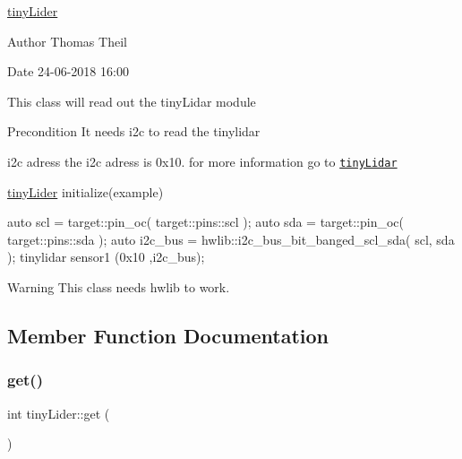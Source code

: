 \mbox{\hyperlink{classtiny_lider}{tiny\+Lider}} 

\begin{DoxyAuthor}{Author}
Thomas Theil 
\end{DoxyAuthor}
\begin{DoxyDate}{Date}
24-\/06-\/2018 16\+:00
\end{DoxyDate}
This class will read out the tiny\+Lidar module

\begin{DoxyPrecond}{Precondition}
It needs i2c to read the tinylidar 
\end{DoxyPrecond}
\begin{DoxyParagraph}{i2c adress}
the i2c adress is 0x10. for more information go to \href{https://microedco.s3.amazonaws.com/tinyLiDAR/Documentation/tinyLiDAR%20Reference%20Manual%20rev1.26.pdf}{\tt tiny\+Lidar}
\end{DoxyParagraph}
\mbox{\hyperlink{classtiny_lider}{tiny\+Lider}} initialize(example) 
\begin{DoxyCode}
\textcolor{keyword}{auto} scl     = target::pin\_oc( target::pins::scl );
\textcolor{keyword}{auto} sda      = target::pin\_oc( target::pins::sda );
\textcolor{keyword}{auto} i2c\_bus = hwlib::i2c\_bus\_bit\_banged\_scl\_sda( scl, sda );
tinylidar sensor1 (0x10 ,i2c\_bus);
\end{DoxyCode}


\begin{DoxyWarning}{Warning}
This class needs hwlib to work. 
\end{DoxyWarning}


\subsection{Member Function Documentation}
\mbox{\label{classtiny_lider_ac69b92b0bd4056f6378e7e13aafa57b5}} 
\subsubsection{\texorpdfstring{get()}{get()}}
{\footnotesize\ttfamily int tiny\+Lider\+::get (\begin{DoxyParamCaption}{ }\end{DoxyParamCaption})\hspace{0.3cm}{\ttfamily [virtual]}}




